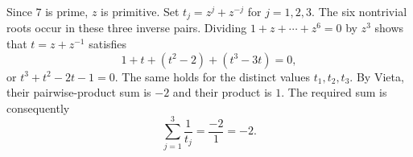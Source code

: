 Since $7$ is prime, $z$ is primitive. Set $t_j=z^j+z^{-j}$ for $j=1,2,3$. The six nontrivial roots occur in these three inverse pairs. Dividing $1+z+\cdots+z^6=0$ by $z^3$ shows that $t=z+z^{-1}$ satisfies
\[
1+t+(t^2-2)+(t^3-3t)=0,
\]
or $t^3+t^2-2t-1=0$. The same holds for the distinct values $t_1,t_2,t_3$. By Vieta, their pairwise-product sum is $-2$ and their product is $1$. The required sum is consequently
\[
\sum_{j=1}^3\dfrac{1}{t_j}=\dfrac{-2}{1}=\boxed{-2}.
\]
